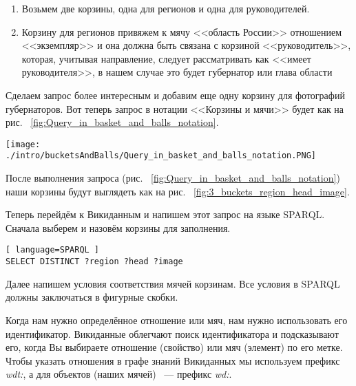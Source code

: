 \begin{enumerate}
    \item Возьмем две корзины, одна для регионов и одна для руководителей.
    \item Корзину для регионов привяжем к мячу <<область России>> отношением <<экземпляр>> и она должна быть связана с корзиной <<руководитель>>, которая, учитывая направление, следует рассматривать как <<имеет руководителя>>, в нашем случае это будет губернатор или глава области
\end{enumerate}

Сделаем запрос более интересным и добавим еще одну корзину для фотографий губернаторов. Вот теперь запрос в нотации <<Корзины и мячи>> будет как на рис. ~\ref{fig:Query_in_basket_and_balls_notation}.

\begin{figure*}[h!]
    \texttt{[image: ./intro/bucketsAndBalls/Query\_in\_basket\_and\_balls\_notation.PNG]}
    \caption{Корзины и мячи для заполнения корзин <<руководитель>> мячами <<областей России>> и <<фотографиями>>.}
	\label{fig:Query_in_basket_and_balls_notation}
\end{figure*}

\newpage
После выполнения запроса (рис. ~\ref{fig:Query_in_basket_and_balls_notation}) наши корзины будут выглядеть как на рис. ~\ref{fig:3_buckets_region_head_image}.

\begin{marginfigure}
	{
		\setlength{\fboxsep}{0pt}%
		\setlength{\fboxrule}{1pt}%
	}
    \caption{Корзины после выполнении запроса. \textit{``?region``} ~--- это области России, \textit{``?head``} ~--- это руководители, \textit{``?image``} ~--- это фотографии руководства.}
	\label{fig:3_buckets_region_head_image}
\end{marginfigure}

Теперь перейдём к Викиданным и напишем этот запрос на языке SPARQL. Сначала выберем и назовём корзины для заполнения.

\begin{lstlisting}[ language=SPARQL ]
SELECT DISTINCT ?region ?head ?image
\end{lstlisting}

Далее напишем условия соответствия мячей корзинам. Все условия в SPARQL должны заключаться в фигурные скобки.

Когда нам нужно определённое отношение или мяч, нам нужно использовать его идентификатор. Викиданные облегчают поиск идентификатора и подсказывают его, когда Вы выбираете отношение (свойство) или мяч (элемент) по его метке. Чтобы указать отношения в графе знаний Викиданных мы используем префикс \textit{wdt:}, а для объектов (наших мячей) ~--- префикс \textit{wd:}.

